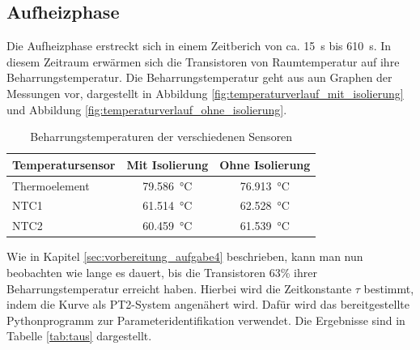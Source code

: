 \subsection{Aufheizphase}
Die Aufheizphase erstreckt sich in einem Zeitberich von ca. \SI{15}{\second} bis \SI{610}{\second}. In diesem Zeitraum erwärmen sich die Transistoren von Raumtemperatur auf ihre Beharrungstemperatur.
Die Beharrungstemperatur geht aus aun Graphen der Messungen vor, dargestellt in Abbildung \ref{fig:temperaturverlauf_mit_isolierung} und Abbildung \ref{fig:temperaturverlauf_ohne_isolierung}.
\begin{table}[H]
    \centering
    \begin{tabular}{l|c|c}
        \toprule
        \textbf{Temperatursensor} & \textbf{Mit Isolierung}     & \textbf{Ohne Isolierung}    \\
        \midrule
        Thermoelement             & \SI{79.586}{\degreeCelsius} & \SI{76.913}{\degreeCelsius} \\
        NTC1                      & \SI{61.514}{\degreeCelsius} & \SI{62.528}{\degreeCelsius} \\
        NTC2                      & \SI{60.459}{\degreeCelsius} & \SI{61.539}{\degreeCelsius} \\
        \bottomrule
    \end{tabular}
    \caption{Beharrungstemperaturen der verschiedenen Sensoren}
    \label{tab:beharrungstemperaturen}
\end{table}
Wie in Kapitel \ref{sec:vorbereitung_aufgabe4} beschrieben, kann man nun beobachten wie lange es dauert, bis die Transistoren 63\% ihrer Beharrungstemperatur erreicht haben. Hierbei wird die Zeitkonstante $\tau$ bestimmt, indem die Kurve als PT2-System angenähert wird. Dafür wird das bereitgestellte Pythonprogramm zur Parameteridentifikation verwendet. Die Ergebnisse sind in Tabelle \ref{tab:taus} dargestellt.
